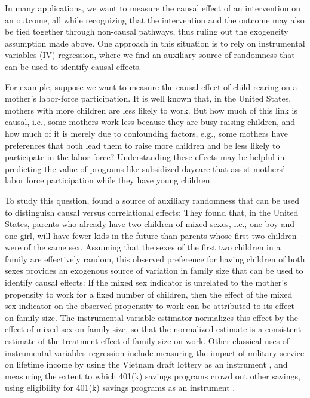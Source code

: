 \documentclass[aos]{imsart}
\theoremstyle{plain}
\theoremstyle{definition}
\theoremstyle{remark}
\begin{document}
\begin{CJK}{UTF8}{gbsn}
{In many applications, we want to measure the causal effect of an intervention on
an outcome, all while recognizing that the intervention and the outcome may also be tied
together through non-causal pathways, thus ruling out the exogeneity assumption
made above. One approach in this situation is to rely on
instrumental variables (IV) regression, where we find an auxiliary source of randomness that can
be used to identify causal effects.

For example, suppose we want to measure the causal effect of child rearing on
a mother's labor-force participation. It is well known that, in the United States, mothers with more children are
less likely to work. But how much of this link is causal, i.e., some mothers work less because they
are busy raising children, and how much of it is merely due to confounding factors, e.g., some mothers have
preferences that both lead them to raise more children and be less likely to participate in the
labor force? Understanding these effects may be helpful in predicting the value of programs
like subsidized daycare that assist mothers' labor force participation while they have young children.

To study this question, \citet{angrist1998children} found a source of auxiliary randomness that can
be used to distinguish causal versus correlational effects: They found that, in the United States, parents who already
have two children of mixed sexes, i.e., one boy and one girl, will have fewer kids in the future than parents
whose first two children were of the same sex. Assuming that the sexes of the first two children in a family
are effectively random, this observed preference for having children of both sexes provides an exogenous source
of variation in family size that can be used to identify causal effects: If the mixed sex indicator is unrelated
to the mother's propensity to work for a fixed number of children, then the effect of the mixed sex 
indicator on the observed propensity to work can be attributed to its effect on family size.  The instrumental
variable estimator normalizes this effect by the effect of mixed sex on family size, so that the normalized estimate
is a consistent estimate of the treatment effect of family size on work.
Other classical uses of instrumental variables regression include measuring the impact of military
service on lifetime income by using the Vietnam draft lottery as an instrument \citep{angrist1990lifetime}, 
and measuring the extent to which 401(k) savings programs crowd out other savings, using
eligibility for 401(k) savings programs as an instrument \citep{abadie2003semiparametric,poterba1996retirement}.

}
\end{CJK}
\end{document}
